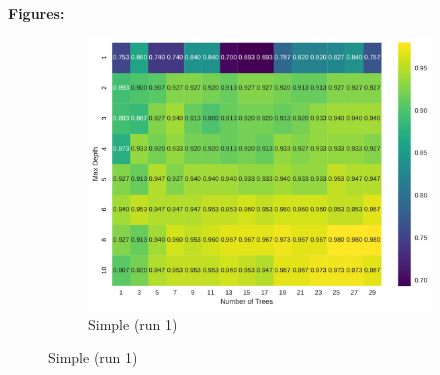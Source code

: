 \documentclass[conference]{IEEEtran}
\begin{document}
\textbf{Figures:}
\begin{figure}[H]
  \centering
  \begin{subfigure}[b]{\columnwidth}
    \includegraphics[width=\linewidth]{images/simple_depth_vs_trees_heatmap.pdf}
    \caption{Simple (run 1)}
    \label{fig:exp3-simple-heatmap-a}
  \end{subfigure}\hfill


\end{figure}
\end{document}
